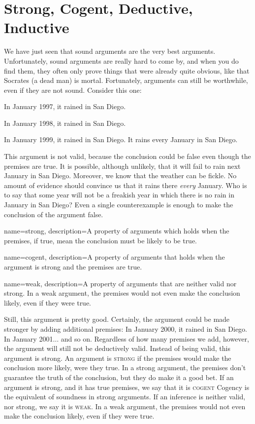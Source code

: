 \section{Strong, Cogent, Deductive, Inductive}

We have just seen that sound arguments are the very best arguments. Unfortunately, sound arguments are really hard to come by, and when you do find them, they often only prove things that were already quite obvious, like that Socrates (a dead man) is mortal. Fortunately, arguments can still be worthwhile, even if they are not sound. Consider this one:

\begin{earg*}
\item In January 1997, it rained in San Diego.
\item In January 1998, it rained in San Diego.
\item In January 1999, it rained in San Diego.
\itemc[.6] It rains every January in San Diego.
\end{earg*}


This argument is not valid, because the conclusion could be false even though the premises are true. It is possible, although unlikely, that it will fail to rain next January in San Diego. Moreover, we know that the weather can be fickle. No amount of evidence should convince us that it rains there \emph{every} January. Who is to say that some year will not be a freakish year in which there is no rain in January in San Diego? Even a single counterexample is enough to make the conclusion of the argument false.

{
name=strong,
description={A property of arguments which holds when the premises, if true, mean the conclusion must be likely to be true.}
}


{
name=cogent,
description={A property of arguments that holds when the argument is strong and the premises are true.}
}



{
name=weak,
description={A property of arguments that are neither valid nor strong. In a weak argument, the premises would not even make the conclusion likely, even if they were true.}
}



Still, this argument is pretty good. Certainly, the argument could be made stronger by adding additional premises: In January 2000, it rained in San Diego. In January 2001$\ldots$ and so on. Regardless of how many premises we add, however, the argument will still not be deductively valid. Instead of being valid, this argument is strong. An argument is \textsc{\gls{strong}} \label{def:strong} if the premises would make the conclusion more likely, were they true. In a strong argument, the premises don't guarantee the truth of the conclusion, but they do make it a good bet. If an argument is strong, and it has true premises, we say that it is \textsc{\gls{cogent}} \label{def:cogent} Cogency is the equivalent of soundness in strong arguments. If an inference is neither valid, nor strong, we say it is \textsc{\gls{weak}}. \label{def:weak}In a weak argument, the premises would not even make the conclusion likely, even if they were true.

